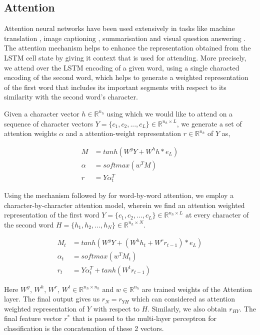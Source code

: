 \documentclass[11pt,letterpaper]{article}
\begin{document}
\subsection{Attention}

Attention neural networks have been used extensively in tasks like machine translation \cite{}, image captioning \cite{}, summarisation \cite{} and visual question answering \cite{}. The attention mechanism helps to enhance the representation obtained from the LSTM cell state by giving it context that is used for attending. More precisely, we attend over the LSTM encoding of a given word, using a single characted encoding of the second word, which helps to generate a weighted representation of the first word that includes its important segments with respect to its similarity with the second word's character. 

Given a character vector $h \in  \mathbb{R}^{n_h}$ using which we would like to attend on a sequence of character vectors $Y = \{c_1, c_2, ..., c_L\} \in \mathbb{R}^{n_h \times L}$, we generate a set of attention weights $\alpha$ and a attention-weight representation $r \in  \mathbb{R}^{n_h}$ of $Y$ as,

\begin{align}
M &= tanh(W^yY + W^hh*e_L) \\
\alpha &= softmax(w^TM) \\
r &= Y\alpha_t^T
\end{align}

Using the mechanism followed by \citet{rocktaschel2016reasoning} for word-by-word attention, we employ a character-by-character attention model, wherein we find an attention weighted representation of the first word $Y = \{c_1, c_2, ..., c_L\} \in \mathbb{R}^{n_h \times L}$ at every character of the second word $H = \{h_1, h_2, ..., h_N\} \in \mathbb{R}^{n_h \times N}$.

\begin{align}
M_t &= tanh(W^yY + (W^hh_t + W^rr_{t-1})*e_L) \\
\alpha_t &= softmax(w^TM_t) \\
r_t &= Y\alpha_t^T + tanh(W^tr_{t-1})
\end{align}

Here $W^y$, $W^h$, $W^r$, $W^t \in  \mathbb{R}^{n_h \times n_h}$ and $w \in \mathbb{R}^{n_h}$ are trained weights of the Attention layer. The final output gives us $r_N = r_{YH}$ which can considered as attention weighted representation of $Y$ with respect to $H$. Similarly, we also obtain $r_{HY}$. The final feature vector $r^*$ that is passed to the multi-layer perceptron for classification is the concatenation of these 2 vectors.
\end{document}
